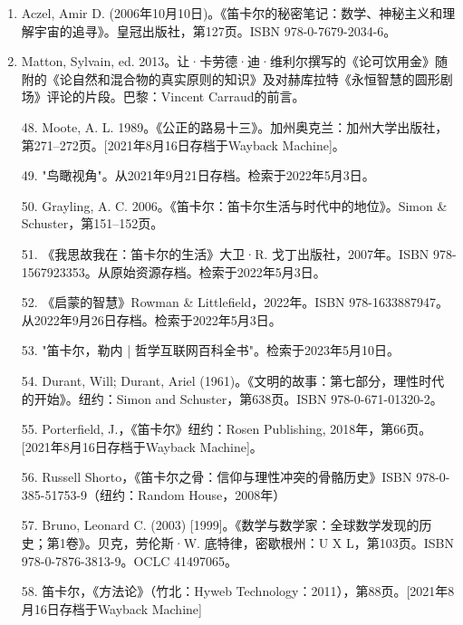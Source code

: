 \begin{enumerate}
\item Aczel, Amir D. (2006年10月10日)。《笛卡尔的秘密笔记：数学、神秘主义和理解宇宙的追寻》。皇冠出版社，第127页。ISBN 978-0-7679-2034-6。

\item Matton, Sylvain, ed. 2013。让·卡劳德·迪·维利尔撰写的《论可饮用金》随附的《论自然和混合物的真实原则的知识》及对赫库拉特《永恒智慧的圆形剧场》评论的片段。巴黎：Vincent Carraud的前言。

48. Moote, A. L. 1989。《公正的路易十三》。加州奥克兰：加州大学出版社，第271–272页。[2021年8月16日存档于Wayback Machine]。

49. "鸟瞰视角"。从2021年9月21日存档。检索于2022年5月3日。

50. Grayling, A. C. 2006。《笛卡尔：笛卡尔生活与时代中的地位》。Simon & Schuster，第151–152页。

51. 《我思故我在：笛卡尔的生活》大卫·R. 戈丁出版社，2007年。ISBN 978-1567923353。从原始资源存档。检索于2022年5月3日。

52. 《启蒙的智慧》Rowman & Littlefield，2022年。ISBN 978-1633887947。从2022年9月26日存档。检索于2022年5月3日。

53. "笛卡尔，勒内 | 哲学互联网百科全书"。检索于2023年5月10日。

54. Durant, Will; Durant, Ariel (1961)。《文明的故事：第七部分，理性时代的开始》。纽约：Simon and Schuster，第638页。ISBN 978-0-671-01320-2。

55. Porterfield, J.，《笛卡尔》纽约：Rosen Publishing, 2018年，第66页。[2021年8月16日存档于Wayback Machine]。

56. Russell Shorto，《笛卡尔之骨：信仰与理性冲突的骨骼历史》ISBN 978-0-385-51753-9（纽约：Random House，2008年）

57. Bruno, Leonard C. (2003) [1999]。《数学与数学家：全球数学发现的历史；第1卷》。贝克，劳伦斯·W. 底特律，密歇根州：U X L，第103页。ISBN 978-0-7876-3813-9。OCLC 41497065。

58. 笛卡尔，《方法论》（竹北：Hyweb Technology：2011），第88页。[2021年8月16日存档于Wayback Machine]
\end{enumerate}